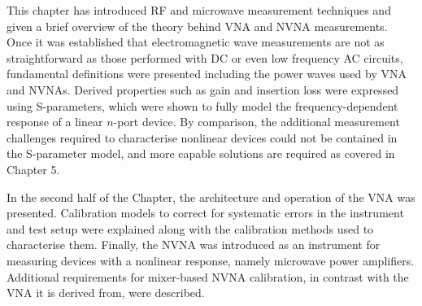 \documentclass[../thesis/thesis.tex]{subfiles}
\begin{document}
\begin{refsection}
This chapter has introduced RF and microwave measurement techniques and given a brief overview of the theory behind VNA and NVNA measurements. Once it was established that electromagnetic wave measurements are not as straightforward as those performed with DC or even low frequency AC circuits, fundamental definitions were presented including the power waves used by VNA and NVNAs. Derived properties such as gain and insertion loss were expressed using S-parameters, which were shown to fully model the frequency-dependent response of a linear $n$-port device. By comparison, the additional measurement challenges required to characterise nonlinear devices could not be contained in the S-parameter model, and more capable solutions are required as covered in Chapter 5.

In the second half of the Chapter, the architecture and operation of the VNA was presented. Calibration models to correct for systematic errors in the instrument and test setup were explained along with the calibration methods used to characterise them. Finally, the NVNA was introduced as an instrument for measuring devices with a nonlinear response, namely microwave power amplifiers. Additional requirements for mixer-based NVNA calibration, in contrast with the VNA it is derived from, were described.

\printbibliography
\end{refsection}
\end{document}
